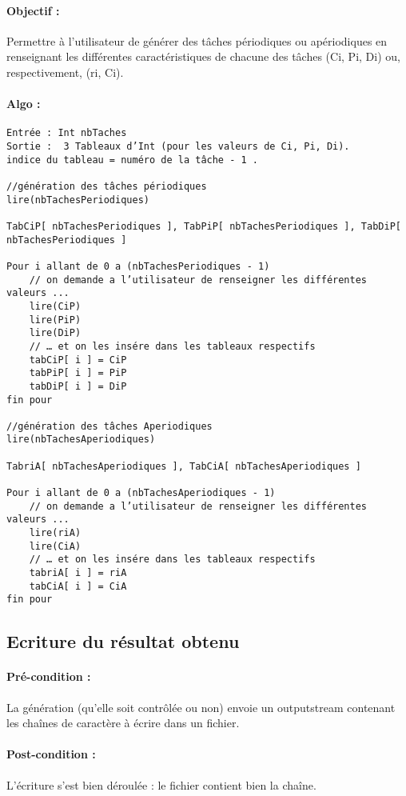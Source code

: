 		\paragraph{Objectif :} Permettre à l’utilisateur de générer des tâches périodiques ou apériodiques en renseignant les différentes caractéristiques de chacune des tâches (Ci, Pi, Di) ou, respectivement, (ri, Ci).
		\paragraph{Algo :} 
			\begin{verbatim}
Entrée : Int nbTaches
Sortie :  3 Tableaux d’Int (pour les valeurs de Ci, Pi, Di). 
indice du tableau = numéro de la tâche - 1 .

//génération des tâches périodiques
lire(nbTachesPeriodiques)

TabCiP[ nbTachesPeriodiques ], TabPiP[ nbTachesPeriodiques ], TabDiP[ nbTachesPeriodiques ]
		
Pour i allant de 0 a (nbTachesPeriodiques - 1)
	// on demande a l’utilisateur de renseigner les différentes valeurs ...
	lire(CiP)
	lire(PiP)
	lire(DiP)        
	// … et on les insére dans les tableaux respectifs
	tabCiP[ i ] = CiP
	tabPiP[ i ] = PiP
	tabDiP[ i ] = DiP
fin pour

//génération des tâches Aperiodiques
lire(nbTachesAperiodiques)

TabriA[ nbTachesAperiodiques ], TabCiA[ nbTachesAperiodiques ]
		
Pour i allant de 0 a (nbTachesAperiodiques - 1)
	// on demande a l’utilisateur de renseigner les différentes valeurs ...
	lire(riA)
	lire(CiA)        
	// … et on les insére dans les tableaux respectifs
	tabriA[ i ] = riA
	tabCiA[ i ] = CiA
fin pour

			\end{verbatim}

	\subsection{Ecriture du résultat obtenu}
		\paragraph{Pré-condition :} La génération (qu'elle soit contrôlée ou non) envoie un outputstream contenant les chaînes de caractère à écrire dans un fichier.
		\paragraph{Post-condition :} L'écriture s'est bien déroulée : le fichier contient bien la chaîne.
